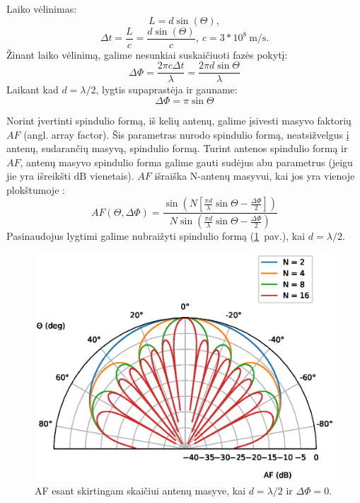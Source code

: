 \documentclass[main.tex]{subfiles}
\begin{document}
Laiko vėlinimas:
\begin{equation}
    L = d\sin(\Theta),
\end{equation}
\begin{equation}
    \Delta t = \frac{L}{c}=\frac{d\sin(\Theta)}{c},\ c = 3 * 10^8\ \mathrm{m/s}.
\end{equation}
Žinant laiko vėlinimą, galime nesunkiai suskaičiuoti fazės pokytį:
\begin{equation}
    \Delta \Phi = \frac{2\pi c \Delta t}{\lambda} = \frac{2\pi d \sin{\Theta}}{\lambda}
    \label{eq:phase_shift}
\end{equation}
Laikant kad $d = \lambda / 2$,  lygtis supaprastėja ir gauname:
\begin{equation}
    \Delta \Phi = \pi \sin{\Theta}
\end{equation}

Norint įvertinti spindulio formą, iš kelių antenų, galime įsivesti masyvo faktorių
$AF$ (angl. array factor). Šis parametras nurodo spindulio formą, neatsižvelgus
į antenų, sudarančių masyvą, spindulio formą. Turint antenos spindulio formą
ir $AF$, antenų masyvo spindulio forma galime gauti sudėjus abu parametrus
(jeigu jie yra išreikšti $\mathrm{dB}$ vienetais).
$AF$ išraiška N-antenų masyvui, kai jos yra vienoje plokštumoje \cite{phase_array_handbook}:
\begin{equation}
    AF(\Theta,\Delta \Phi) = \frac{\sin{\left( N\left[ \frac{\pi d}{\lambda} \sin{\Theta} - \frac{\Delta \Phi}{2} \right] \right)}}{N \sin{\left( \frac{\pi d}{\lambda}\sin{\Theta}-\frac{\Delta \Phi}{2}\right)}}
    \label{eq:array_factor}
\end{equation}
Pasinaudojus  lygtimi galime nubraižyti spindulio formą (\ref{fig:af_polar_plot}~pav.), kai $d=\lambda /2$.

\begin{figure}[h]
    \begin{centering}
    \includegraphics[scale=0.8]{drawings/af_polar_plot}
    \par\end{centering}
    \protect\caption{\label{fig:af_polar_plot}AF esant skirtingam skaičiui antenų masyve, kai $d=\lambda / 2$ ir $\Delta \Phi = 0$.}
\end{figure}
\end{document}
